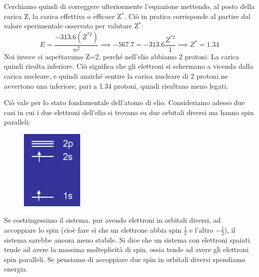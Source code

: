 Cerchiamo quindi di correggere ulteriormente l'equazione mettendo, al posto della carica Z, la carica effettiva o efficace Z$^*$. Ciò in pratica corrisponde al partire dal valore sperimentale osservato per valutare Z$^*$:
$$E=\frac{-313.6(Z^{*2})}{n^2} \implies -567.7=-313.6\frac{Z^{*2}}{1} \implies Z^*=1.34$$
Noi invece ci aspettavamo Z=2, perché nell'elio abbiamo 2 protoni. La carica quindi risulta inferiore. Ciò significa che gli elettroni si schermano a vicenda dalla carica nucleare, e quindi anziché sentire la carica nucleare di 2 protoni ne avvertono una inferiore, pari a 1.34 protoni, quindi risultano meno legati.

\vspace{0.2cm}Ciò vale per lo stato fondamentale dell'atomo di elio. Consideriamo adesso due casi in cui i due elettroni dell'elio si trovano su due orbitali diversi ma hanno spin paralleli:

\hspace{0.5cm}\begin{minipage}{0.25\textwidth}
  \begin{figure}[H]
  \includegraphics[width=3cm]{immagini/elettrone_2s.png}
  \end{figure}
\end{minipage}
\begin{minipage}{0.7\textwidth}
  \vspace{0.6cm}Se costringessimo il sistema, pur avendo elettroni in orbitali diversi, ad accoppiare lo spin (cioè fare sì che un elettrone abbia spin $\frac{1}{2}$ e l'altro $-\frac{1}{2}$), il sistema sarebbe ancora meno stabile. Si dice che un sistema con elettroni spaiati tende ad avere la massima molteplicità di spin, ossia tende ad avere gli elettroni spin paralleli. Se pensiamo di accoppiare due spin in orbitali diversi spendiamo energia.\end{minipage}

